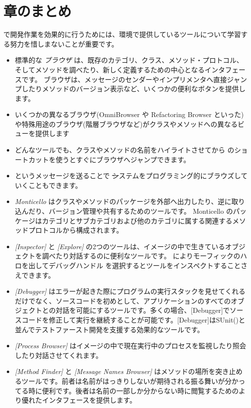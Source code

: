 \documentclass[a4paper,10pt,twoside]{book}
\begin{document}
\section{章のまとめ}

\pharo で開発作業を効果的に行うためには、環境で提供しているツールについて学習する努力を惜しまないことが重要です。

\begin{itemize}
  \item 標準的な \emph{ブラウザ} は、既存のカテゴリ、クラス、メソッド・プロトコル、そしてメソッドを調べたり、新しく定義するための中心となるインタフェースです。
    ブラウザは、メッセージのセンダーやインプリメンタへ直接ジャンプしたりメソッドのバージョン表示など、いくつかの便利なボタンを提供します。
  \item いくつかの異なるブラウザ(OmniBrowser や Refactoring Browser といった)や特殊用途のブラウザ(階層ブラウザなど)がクラスやメソッドへの異なるビューを提供します
  \item どんなツールでも、クラスやメソッドの名前をハイライトさせてから  のショートカットを使うとすぐにブラウザへジャンプできます。
  \item {} というメッセージを送ることで \st システムをプログラミング的にブラウズしていくこともできます。
  \item \emph{Monticello} はクラスやメソッドのパッケージを外部へ出力したり、逆に取り込んだり、バージョン管理や共有するためのツールです。
    Monticello のパッケージはカテゴリとサブカテゴリおよび他のカテゴリに属する関連するメソッドプロトコルから構成されます。
  \item \emph{[Inspector]} と \emph{[Explore]} の2つのツールは、イメージの中で生きているオブジェクトを調べたり対話するのに便利なツールです。
     によりモーフィックのハロを出してデバッグハンドル \debugHandle を選択するとツールをインスペクトすることさえできます。
  \item \emph{[Debugger]} はエラーが起きた際にプログラムの実行スタックを見せてくれるだけでなく、ソースコードを初めとして、アプリケーションのすべてのオブジェクトとの対話を可能にするツールです。多くの場合、[Debugger]でソースコードを修正して実行を継続することが可能です。[Debugger]はSUnit()と並んでテストファースト開発を支援する効果的なツールです。
  \item \emph{[Process Browser]} はイメージの中で現在実行中のプロセスを監視したり照会したり対話させてくれます。
  \item \emph{[Method Finder]} と \emph{[Message Names Browser]} はメソッドの場所を突き止めるツールです。前者は名前がはっきりしないが期待される振る舞いが分かってる時に便利です。後者は名前の一部しか分からない時に閲覧するためのより優れたインタフェースを提供します。

\end{itemize}
\end{document}
